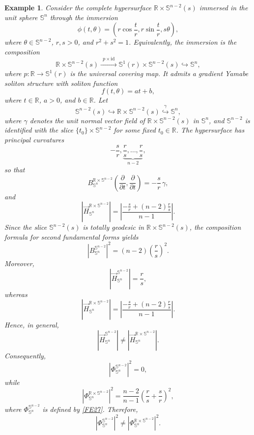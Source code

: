 \documentclass[11pt]{amsart}
\newtheorem{example}[theorem]{Example}
\numberwithin{equation}{section}
\begin{document}
\begin{example}\label{exam3}
    Consider the complete hypersurface
    $\mathbb{R}\times\mathbb{S}^{n-2}(s)$ immersed in the unit sphere
    $\mathbb{S}^{n}$ through the immersion
    \[
    \phi(t,\theta)
    =
    \left(
    r\cos\frac{t}{r},
    r\sin\frac{t}{r},
    s\theta
    \right),
    \]
    where $\theta\in\mathbb{S}^{n-2}$, $r,s>0$, and
    $r^{2}+s^{2}=1$.  Equivalently, the immersion is the composition
    \[
    \mathbb{R}\times\mathbb{S}^{n-2}(s)
    \xrightarrow{\;\,p\times\mathrm{id}\,\;}
    \mathbb{S}^{1}(r)\times\mathbb{S}^{n-2}(s)
    \hookrightarrow
    \mathbb{S}^{n},
    \]
    where $p:\mathbb{R}\rightarrow\mathbb{S}^{1}(r)$ is the universal covering map.
    It admits a gradient Yamabe soliton structure with soliton function
    \[
    f(t,\theta)=at+b,
    \]
    where $t\in\mathbb{R}$, $a>0$, and $b\in\mathbb{R}$.
Let
    \[
    \mathbb{S}^{n-2}(s)
    \hookrightarrow
    \mathbb{R}\times\mathbb{S}^{n-2}(s)
    \overset{\gamma}{\hookrightarrow}
    \mathbb{S}^{n},
    \]
    where $\gamma$ denotes the unit normal vector field of
    $\mathbb{R}\times\mathbb{S}^{n-2}(s)$ in $\mathbb{S}^{n}$, and
    $\mathbb{S}^{n-2}$ is identified with the slice
    $\{t_{0}\}\times\mathbb{S}^{n-2}$ for some fixed
    $t_{0}\in\mathbb{R}$.
    The hypersurface has principal curvatures
    \[
    -\frac{s}{r},
    \underbrace{\frac{r}{s},\ldots,\frac{r}{s}}_{n-2},
    \]
    so that
    \[
    B^{\mathbb{R}\times\mathbb{S}^{n-2}}_{\mathbb{S}^{n}}
    \left(
    \frac{\partial}{\partial t},
    \frac{\partial}{\partial t}
    \right)
    =
    -\frac{s}{r}\,\gamma,
    \]
    and
    \[
    \left|
    \vec{H}^{\mathbb{R}\times\mathbb{S}^{n-2}}_{\mathbb{S}^{n}}
    \right|
    =
    \left|
    \frac{-\frac{s}{r}+(n-2)\frac{r}{s}}{n-1}
    \right|.
    \]
    Since the slice $\mathbb{S}^{n-2}(s)$ is totally geodesic in
    $\mathbb{R}\times\mathbb{S}^{n-2}(s)$, the composition formula for second
    fundamental forms yields
    \[
    \left|
    B^{\mathbb{S}^{n-2}}_{\mathbb{S}^{n}}
    \right|^{2}
    =
    (n-2)\left(\frac{r}{s}\right)^{2}.
    \]
    Moreover,
    \[
    \left|
    \vec{H}^{\mathbb{S}^{n-2}}_{\mathbb{S}^{n}}
    \right|
    =
    \frac{r}{s},
    \]
    whereas
    \[
    \left|
    \vec{H}^{\mathbb{R}\times\mathbb{S}^{n-2}}_{\mathbb{S}^{n}}
    \right|
    =
    \left|
    \frac{-\frac{s}{r}+(n-2)\frac{r}{s}}{n-1}
    \right|.
    \]
    Hence, in general,
    \[
    \left|
    \vec{H}^{\mathbb{S}^{n-2}}_{\mathbb{S}^{n}}
    \right|
    \neq
    \left|
    \vec{H}^{\mathbb{R}\times\mathbb{S}^{n-2}}_{\mathbb{S}^{n}}
    \right|.
    \]
    Consequently,
    \[
    \left|
    \Phi^{\mathbb{S}^{n-2}}_{\mathbb{S}^{n}}
    \right|^{2}
    =0,
    \]
    while
    \[
    \left|
    \Phi^{\mathbb{R}\times\mathbb{S}^{n-2}}_{\mathbb{S}^{n}}
    \right|^{2}
    =
    \frac{n-2}{n-1}
    \left(
    \frac{r}{s}
    +
    \frac{s}{r}
    \right)^{2},
    \]
where $\Phi^{\mathbb{S}^{n-2}}_{\mathbb{S}^{n}}$ is defined by \eqref{FE27}. Therefore,
    \[
    \left|
    \Phi^{\mathbb{S}^{n-2}}_{\mathbb{S}^{n}}
    \right|^{2}
    \neq
    \left|
    \Phi^{\mathbb{R}\times\mathbb{S}^{n-2}}_{\mathbb{S}^{n}}
    \right|^{2}.
    \]
\end{example}
\end{document}
